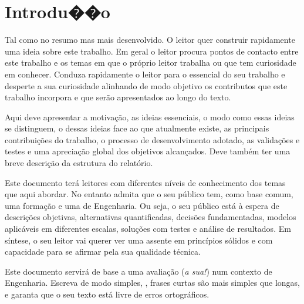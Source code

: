 



\chapter{Introdu��o}
\label{ch:introducao}

Tal como no resumo mas mais desenvolvido. O leitor quer construir rapidamente uma ideia sobre este trabalho. Em geral o leitor procura pontos de contacto entre este trabalho e os temas em que o próprio leitor trabalha ou que tem curiosidade em conhecer.  Conduza rapidamente o leitor para o essencial do seu trabalho e desperte a sua curiosidade alinhando de modo objetivo os contributos que este trabalho incorpora e que serão apresentados ao longo do texto.

Aqui deve apresentar a motivação, as ideias essenciais, o modo como essas ideias se distinguem, o  dessas ideias face ao que atualmente existe, as principais contribuições do trabalho, o processo de desenvolvimento adotado, as validações e testes e uma apreciação global dos objetivos alcançados. Deve também ter uma breve descrição da estrutura do relatório.

Este documento terá leitores com diferentes níveis de conhecimento dos temas que aqui abordar. No entanto admita que o seu público tem, como base comum, uma formação e uma  de Engenharia. Ou seja, o seu público está à espera de descrições objetivas, alternativas quantificadas, decisões fundamentadas, modelos aplicáveis em diferentes escalas, soluções com testes e análise de resultados. Em síntese, o seu leitor vai querer ver uma  assente em princípios sólidos e com capacidade para se afirmar pela sua qualidade técnica.

Este documento servirá de base a uma avaliação (\textit{a sua!}) num contexto de Engenharia. Escreva de modo simples, \eg, frases curtas são mais simples que longas, e garanta que o seu texto está livre de erros ortográficos.

